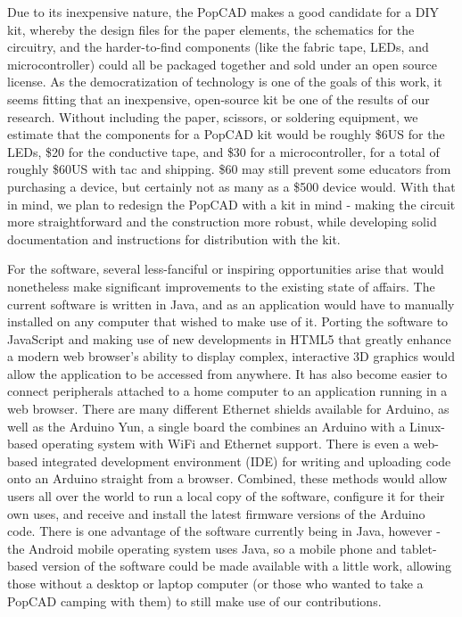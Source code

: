 Due to its inexpensive nature, the PopCAD makes a good candidate for a DIY kit,
whereby the design files for the paper elements, the schematics for the
circuitry, and the harder-to-find components (like the fabric tape, LEDs, and
microcontroller) could all be packaged together and sold under an open source
license. As the democratization of technology is one of the goals of this work,
it seems fitting that an inexpensive, open-source kit be one of the results of
our research. Without including the paper, scissors, or soldering equipment, we
estimate that the components for a PopCAD kit would be roughly \$6US for the
LEDs, \$20 for the conductive tape, and \$30 for a microcontroller, for a total
of roughly \$60US with tac and shipping. \$60 may still prevent some educators
from purchasing a device, but certainly not as many as a \$500 device would.
With that in mind, we plan to redesign the PopCAD with a kit in mind - making
the circuit more straightforward and the construction more robust, while
developing solid documentation and instructions for distribution with the kit.

For the software, several less-fanciful or inspiring opportunities arise that
would nonetheless make significant improvements to the existing state of
affairs. The current software is written in Java, and as an application would
have to manually installed on any computer that wished to make use of it.
Porting the software to JavaScript and making use of new developments in HTML5
that greatly enhance a modern web browser's ability to display complex,
interactive 3D graphics would allow the application to be accessed from
anywhere. It has also become easier to connect peripherals attached to a home
computer to an application running in a web browser. There are many different
Ethernet shields available for Arduino, as well as the Arduino Yun, a single
board the combines an Arduino with a Linux-based operating system with WiFi and
Ethernet support. There is even a web-based integrated development environment
(IDE) for writing and uploading code onto an Arduino straight from a
browser\cite{CodeBender}. Combined, these methods would allow users all over the
world to run a local copy of the software, configure it for their own uses, and
receive and install the latest firmware versions of the Arduino code. There is
one advantage of the software currently being in Java, however - the Android
mobile operating system uses Java, so a mobile phone and tablet-based version of
the software could be made available with a little work, allowing those without
a desktop or laptop computer (or those who wanted to take a PopCAD camping with
them) to still make use of our contributions.


